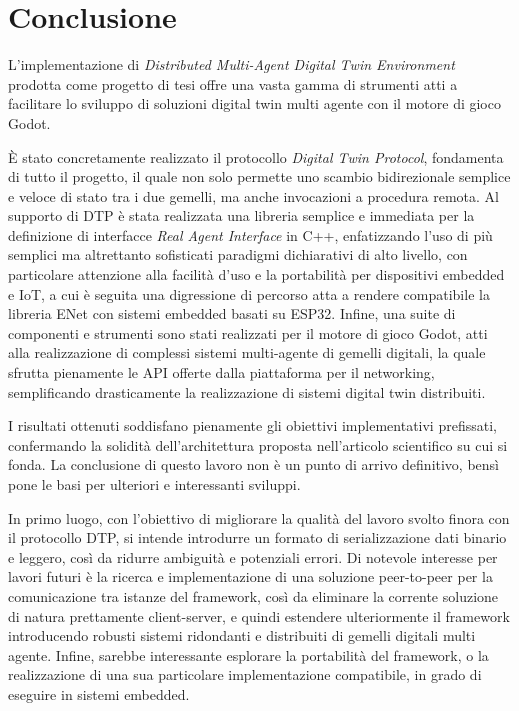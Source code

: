 \chapter*{Conclusione}



\noindent L'implementazione di \textit{Distributed Multi-Agent Digital Twin Environment} prodotta come progetto di tesi offre una vasta gamma di strumenti atti a facilitare lo sviluppo di soluzioni digital twin multi agente con il motore di gioco Godot.

È stato concretamente realizzato il protocollo \textit{Digital Twin Protocol}, fondamenta di tutto il progetto, il quale non solo permette uno scambio bidirezionale semplice e veloce di stato tra i due gemelli, ma anche invocazioni a procedura remota. 
\smallbreak
Al supporto di DTP è stata realizzata una libreria semplice e immediata per la definizione di interfacce \textit{Real Agent Interface} in C++, enfatizzando l'uso di più semplici ma altrettanto sofisticati paradigmi dichiarativi di alto livello, con particolare attenzione alla facilità d'uso e la portabilità per dispositivi embedded e IoT, a cui è seguita una digressione di percorso atta a rendere compatibile la libreria ENet con sistemi embedded basati su ESP32.
\smallbreak
Infine, una suite di componenti e strumenti sono stati realizzati per il motore di gioco Godot, atti alla realizzazione di complessi sistemi multi-agente di gemelli digitali, la quale sfrutta pienamente le API offerte dalla piattaforma per il networking, semplificando drasticamente la realizzazione di sistemi digital twin distribuiti.

I risultati ottenuti soddisfano pienamente gli obiettivi implementativi prefissati, confermando la solidità dell'architettura proposta nell'articolo scientifico su cui si fonda\cite{Russo2025}.
\bigbreak
La conclusione di questo lavoro non è un punto di arrivo definitivo, bensì pone le basi per ulteriori e interessanti sviluppi.

In primo luogo, con l'obiettivo di migliorare la qualità del lavoro svolto finora con il protocollo DTP, si intende introdurre un formato di serializzazione dati binario e leggero, così da ridurre ambiguità e potenziali errori.
\smallbreak
Di notevole interesse per lavori futuri è la ricerca e implementazione di una soluzione peer-to-peer per la comunicazione tra istanze del framework, così da eliminare la corrente soluzione di natura prettamente client-server, e quindi estendere ulteriormente il framework introducendo robusti sistemi ridondanti e distribuiti di gemelli digitali multi agente.
\smallbreak
Infine, sarebbe interessante esplorare la portabilità del framework, o la realizzazione di una sua particolare implementazione compatibile, in grado di eseguire in sistemi embedded.





